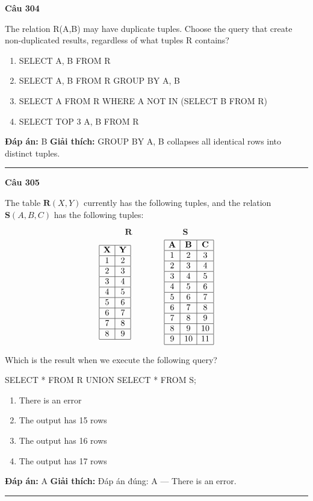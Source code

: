 \documentclass[11pt,a4paper]{article}
\newenvironment{question}[1]{%
  \par\vspace{1em}\noindent\textbf{\large Câu #1}\par\vspace{0.4em}
}{%
  \par\vspace{1em}\hrule\vspace{0.6em}
}
\newenvironment{choices}{%
  \begin{enumerate}[label=\textbf{\Alph*.},leftmargin=2.2em,itemsep=2pt,topsep=3pt]
}{%
  \end{enumerate}
}
\newcommand{\choice}{\item}
\newenvironment{codebox}{%
  \begin{tcolorbox}[colback=gray!8!white,colframe=gray!50!black,arc=1.5mm,boxrule=0.6pt,left=3mm,right=3mm,top=2.5mm,bottom=2.5mm]
  \ttfamily\small
}{%
  \end{tcolorbox}
}
\begin{document}
\begin{question}{304}
The relation R(A,B) may have duplicate tuples. Choose the query that create non-duplicated results, regardless of what tuples R contains?
\begin{choices}
\choice SELECT A, B FROM R
\choice SELECT A, B FROM R GROUP BY A, B
\choice SELECT A FROM R WHERE A NOT IN (SELECT B FROM R)
\choice SELECT TOP 3 A, B FROM R
\end{choices}
\textbf{Đáp án:} B
\textbf{Giải thích:} GROUP BY A, B collapses all identical rows into distinct tuples.
\end{question}

\begin{question}{305}
The table \(\textbf{R}(X, Y)\) currently has the following tuples, and the relation \(\textbf{S}(A, B, C)\) has the following tuples:

\[\textbf{R} \qquad\qquad\qquad \textbf{S}\]
\[\begin{array}{|c|c|}
\hline
\textbf{X} & \textbf{Y} \\
\hline
1 & 2 \\
\hline
2 & 3 \\
\hline
3 & 4 \\
\hline
4 & 5 \\
\hline
5 & 6 \\
\hline
6 & 7 \\
\hline
7 & 8 \\
\hline
8 & 9 \\
\hline
\end{array}
\qquad\qquad
\begin{array}{|c|c|c|}
\hline
\textbf{A} & \textbf{B} & \textbf{C} \\
\hline
1 & 2 & 3 \\
\hline
2 & 3 & 4 \\
\hline
3 & 4 & 5 \\
\hline
4 & 5 & 6 \\
\hline
5 & 6 & 7 \\
\hline
6 & 7 & 8 \\
\hline
7 & 8 & 9 \\
\hline
8 & 9 & 10 \\
\hline
9 & 10 & 11 \\
\hline
\end{array}\]

Which is the result when we execute the following query?
\begin{codebox}
SELECT * FROM R
UNION
SELECT * FROM S;
\end{codebox}
\begin{choices}
\choice There is an error
\choice The output has 15 rows
\choice The output has 16 rows
\choice The output has 17 rows
\end{choices}
\textbf{Đáp án:} A
\textbf{Giải thích:} Đáp án đúng: A — There is an error.


\end{question}
\end{document}
